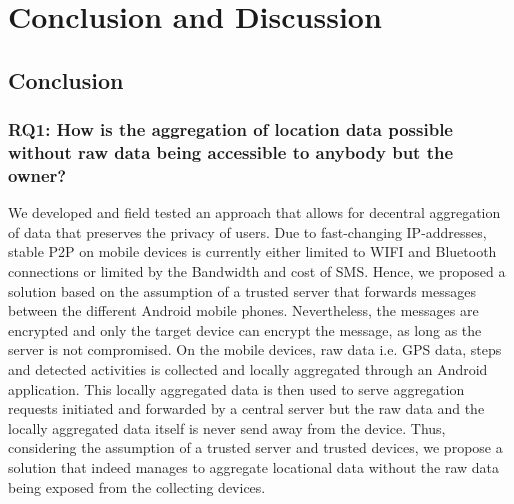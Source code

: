 \chapter{Conclusion and Discussion}\label{chapter:conclusion}
\section{Conclusion}

\subsection*{RQ1: How is the aggregation of location data possible without raw data being accessible to anybody but the owner?}
We developed and field tested an approach that allows for decentral aggregation of data that preserves the privacy of users. Due to fast-changing IP-addresses, stable P2P on mobile devices is currently either limited to WIFI and Bluetooth connections or limited by the Bandwidth and cost of SMS. Hence, we proposed a solution based on the assumption of a trusted server that forwards messages between the different Android mobile phones. Nevertheless, the messages are encrypted and only the target device can encrypt the message, as long as the server is not compromised. On the mobile devices, raw data i.e. GPS data, steps and detected activities is collected and locally aggregated through an Android application. This locally aggregated data is then used to serve aggregation requests initiated and forwarded by a central server but the raw data and the locally aggregated data itself is never send away from the device. Thus, considering the assumption of a trusted server and trusted devices, we propose a solution that indeed manages to aggregate locational data without the raw data being exposed from the collecting devices.

